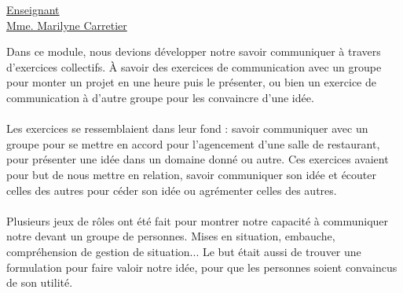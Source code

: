 \renewcommand{\figurename}{}

\vspace*{0.2cm}
      \large
      \href{\@orientadorPagina}{\color{black}Enseignant\\Mme. Marilyne Carretier}\\
      \normalsize
\vspace*{0.5cm}

Dans ce module, nous devions développer notre savoir communiquer à travers d'exercices collectifs. À savoir des exercices de communication avec un groupe pour monter un projet en une heure puis le présenter, ou bien un exercice de communication à d'autre groupe pour les convaincre d'une idée.
\\ \\
Les exercices se ressemblaient dans leur fond : savoir communiquer avec un groupe pour se mettre en accord pour l'agencement d'une salle de restaurant, pour présenter une idée dans un domaine donné ou autre. Ces exercices avaient pour but de nous mettre en relation, savoir communiquer son idée et écouter celles des autres pour céder son idée ou agrémenter celles des autres.
\\ \\
Plusieurs jeux de rôles ont été fait pour montrer notre capacité à communiquer notre devant un groupe de personnes. Mises en situation, embauche, compréhension de gestion de situation... Le but était aussi de trouver une formulation pour faire valoir notre idée, pour que les personnes soient convaincus de son utilité.